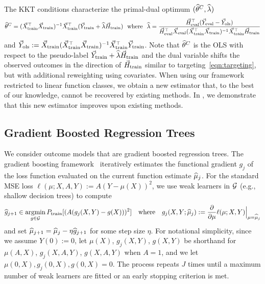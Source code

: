The KKT conditions characterize the primal-dual optimum $(\widehat{\theta}^C, \widehat{\lambda})$
\vspace{-0.7em}
$$
\widehat{\theta}^C = (\vec{X}_{\rm train}^\top \vec{X}_{\rm train})^{-1} \vec{X}_{\rm train}^\top (\vec{Y}_{\rm train}+ \widehat{\lambda} \vec{H}_{\rm train})
~~\mbox{where}~~
\widehat{\lambda} = \frac{\vec{H}_{\rm eval}^\top
(\vec{Y}_{\rm eval} - \vec{Y}_{\rm ols})}{\vec{H}_{\rm eval}^\top \vec{X}_{\rm eval}
(\vec{X}_{\rm train}^\top \vec{X}_{\rm train})^{-1}
\vec{X}_{\rm train}^\top \vec{H}_{\rm train}}
$$
and $\vec{Y}_{\rm ols} := \vec{X}_{\rm train} (\vec{X}_{\rm train}^\top \vec{X}_{\rm train})^{-1}
\vec{X}_{\rm train}^\top \vec{Y}_{\rm train}$. %
Note that $\widehat{\theta}^C$ is the OLS with respect to the pseudo-label $\vec{Y}_{\rm train}+ \widehat{\lambda} \vec{H}_{\rm train}$ and the dual variable shifts the observed outcomes in the direction of $\vec{H}_{\rm train}$ similar to targeting~\eqref{eqn:targeting}, but with additional reweighting using covariates. 
When using our framework restricted to linear function classes, we obtain a new estimator that, to the best of our knowledge, cannot be recovered by existing methods. In , we demonstrate that this new estimator improves upon existing methods.


\subsection{Gradient Boosted Regression Trees}
\label{sec:methods_boosting}
We consider outcome models that are gradient boosted regression trees. %
The gradient boosting framework~\cite{friedman2001greedy} iteratively estimates the functional gradient $g_j$ 
of the loss function evaluated on the current function estimate $\widehat{\mu}_{j}$.
For the standard  MSE loss $\ell(\mu;X,A,Y):=A(Y-\mu(X))^2$, 
we use weak learners in $\mathcal{G}$ (e.g., shallow decision trees) to compute
$$
\widehat{g}_{j+1} \in \mathop{\rm argmin}_{g \in \mathcal G} P_{\rm train} [(A(g_{j}(X,Y)-g(X)))^2]~~~\mbox{where}~~~g_{j}(X,Y;\widehat{\mu}_j) := \frac{\partial}{\partial \mu}\ell(\mu;X,Y)\Big|_{\mu = \widehat{\mu}_{j}}
$$
and set $\widehat{\mu}_{j+1} = \widehat{\mu}_j - \eta \widehat{g}_{j+1}$ for some step size $\eta$. 
For notational simplicity, since we assume $Y(0):=0$, let $\mu(X)$, $g_j(X,Y)$, $g(X,Y)$
be shorthand for $\mu(A,X)$, $g_j(X,A,Y)$, $g(X,A,Y)$ when $A=1$, and we let $\mu(0,X),g_j(0,X),g(0,X)=0$. 
The process repeats $J$ times until a maximum number of weak learners are fitted or an early stopping criterion is met. 

